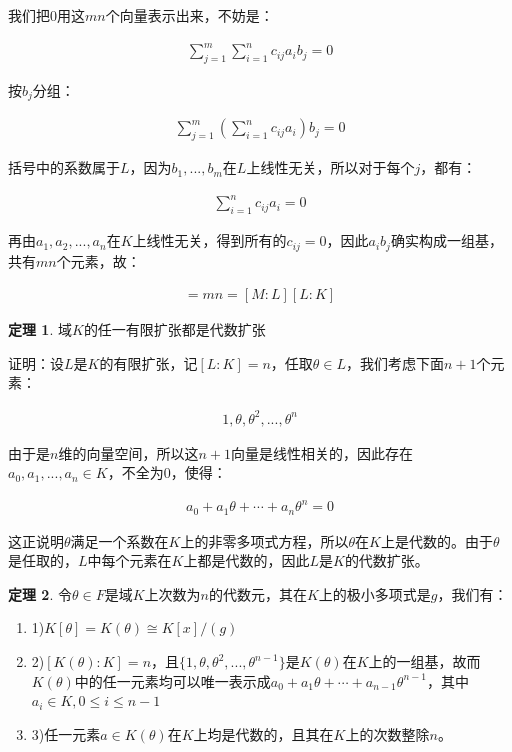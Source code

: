 \documentclass[12pt, a4paper, oneside]{ctexart}
\theoremstyle{definition}
\newtheorem*{theorem}{定理}
\begin{document}
我们把0用这$mn$个向量表示出来，不妨是：

\begin{align*}
\sum_{j=1}^m\sum_{i=1}^nc_{ij}a_ib_j=0
\end{align*}

按$b_j$分组：

\begin{align*}
\sum_{j=1}^m(\sum_{i=1}^nc_{ij}a_i)b_j=0
\end{align*}

括号中的系数属于$L$，因为$b_1,...,b_m$在$L$上线性无关，所以对于每个$j$，都有：

\begin{align*}
\sum_{i=1}^nc_{ij}a_i=0
\end{align*}

再由$a_1,a_2,...,a_n$在$K$上线性无关，得到所有的$c_{ij}=0$，因此$a_ib_j$确实构成一组基，共有$mn$个元素，故：

\begin{align*}
[M:K]=mn=[M:L][L:K]
\end{align*}

\begin{theorem}
域$K$的任一有限扩张都是代数扩张
\end{theorem}

证明：设$L$是$K$的有限扩张，记$[L:K]=n$，任取$\theta\in L$，我们考虑下面$n+1$个元素：

\begin{align*}
1,\theta,\theta^2,...,\theta^n
\end{align*}

由于是$n$维的向量空间，所以这$n+1$向量是线性相关的，因此存在$a_0,a_1,...,a_n\in K$，不全为0，使得：

\begin{align*}
a_0+a_1\theta+\cdots+a_n\theta^n=0
\end{align*}

这正说明$\theta$满足一个系数在$K$上的非零多项式方程，所以$\theta$在$K$上是代数的。由于$\theta$是任取的，$L$中每个元素在$K$上都是代数的，因此$L$是$K$的代数扩张。

\begin{theorem}
令$\theta\in F$是域$K$上次数为$n$的代数元，其在$K$上的极小多项式是$g$，我们有：

\begin{enumerate}
\item 1)$K[\theta]=K(\theta)\cong K[x]/(g)$
\item 2)$[K(\theta):K]=n$，且$\{1,\theta,\theta^2,...,\theta^{n-1}\}$是$K(\theta)$在$K$上的一组基，故而$K(\theta)$中的任一元素均可以唯一表示成$a_0+a_1\theta+\cdots+a_{n-1}\theta^{n-1}$，其中$a_i\in K,0\leqslant i\leqslant n-1$
\item 3)任一元素$a\in K(\theta)$在$K$上均是代数的，且其在$K$上的次数整除$n$。
\end{enumerate}
\end{theorem}
\end{document}
